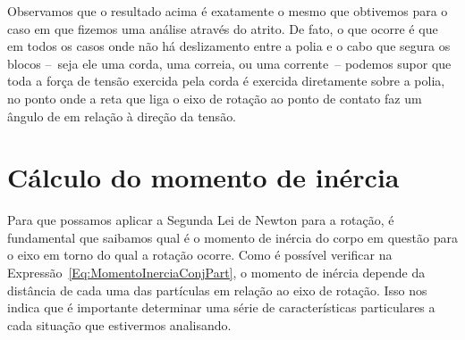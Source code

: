 Observamos que o resultado acima é exatamente o mesmo que obtivemos para o caso em que fizemos uma análise através do atrito. De fato, o que ocorre é que em todos os casos onde não há deslizamento entre a polia e o cabo que segura os blocos --~seja ele uma corda, uma correia, ou uma corrente~-- podemos supor que toda a força de tensão exercida pela corda é exercida diretamente sobre a polia, no ponto onde a reta que liga o eixo de rotação ao ponto de contato faz um ângulo de  em relação à direção da tensão.


\section{Cálculo do momento de inércia}

Para que possamos aplicar a Segunda Lei de Newton para a rotação, é fundamental que saibamos qual é o momento de inércia do corpo em questão para o eixo em torno do qual a rotação ocorre. Como é possível verificar na Expressão~\ref{Eq:MomentoInerciaConjPart}, o momento de inércia depende da distância de cada uma das partículas em relação ao eixo de rotação. Isso nos indica que é importante determinar uma série de características particulares a cada situação que estivermos analisando.

